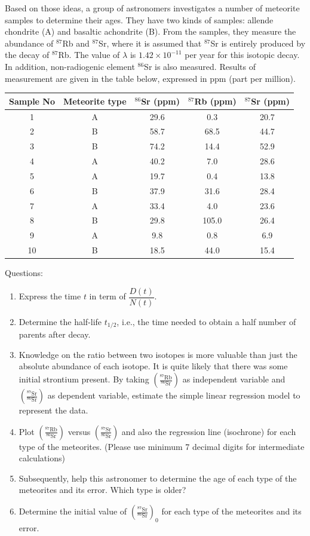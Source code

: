 Based on those ideas, a group of astronomers investigates a number of
meteorite samples to determine their ages. They have two kinds of samples:
allende chondrite (A) and basaltic achondrite (B). From the samples, they
measure the abundance of $^{87}$Rb and $^{87}$Sr, where it is assumed that
$^{87}$Sr is entirely produced by the decay of $^{87}$Rb. The value of
$\lambda$ is $1.42 \times 10^{-11}$ per year for this isotopic decay. In
addition, non-radiogenic element $^{86}$Sr is also measured. Results of
measurement are given in the table below, expressed in ppm (part per
million).

\begin{center}
\begin{tabular}{c|c|c|c|c}
Sample No & Meteorite type & $^{86}$Sr (ppm) & $^{87}$Rb (ppm)
  & $^{87}$Sr (ppm) \\
\hline
1  & A & 29.6 & 0.3   & 20.7 \\
2  & B & 58.7 & 68.5  & 44.7 \\
3  & B & 74.2 & 14.4  & 52.9 \\
4  & A & 40.2 & 7.0   & 28.6 \\
5  & A & 19.7 & 0.4   & 13.8 \\
6  & B & 37.9 & 31.6  & 28.4 \\
7  & A & 33.4 & 4.0   & 23.6 \\
8  & B & 29.8 & 105.0 & 26.4 \\
9  & A & 9.8  & 0.8   & 6.9  \\
10 & B & 18.5 & 44.0  & 15.4 \\
\end{tabular}
\end{center}

Questions:
\begin{enumerate}
\item Express the time $t$ in term of $\dfrac{D(t)}{N(t)}$.
\item Determine the half-life $t_{1/2}$, i.e., the time needed to obtain a
  half number of parents after decay.
\item Knowledge on the ratio between two isotopes is more valuable than just
  the absolute abundance of each isotope. It is quite likely that there was
  some initial strontium present. By taking
  $\left(\frac{^{87}\mathrm{Rb}}{^{86}\mathrm{Sr}}\right)$ as independent
  variable and $\left(\frac{^{87}\mathrm{Sr}}{^{86}\mathrm{Sr}}\right)$ as
  dependent variable, estimate the simple linear regression model to
  represent the data.
\item Plot $\left(\frac{^{87}\mathrm{Rb}}{^{86}\mathrm{Sr}}\right)$ versus
  $\left(\frac{^{87}\mathrm{Sr}}{^{86}\mathrm{Sr}}\right)$ and also the
  regression line (isochrone) for each type of the meteorites. (Please use
  minimum 7 decimal digits for intermediate calculations)
\item Subsequently, help this astronomer to determine the age of each type of
  the meteorites and its error. Which type is older?
\item Determine the initial value of
  $\left(\frac{^{87}\mathrm{Sr}}{^{86}\mathrm{Sr}}\right)_0$ for each type of
  the meteorites and its error.
\end{enumerate}

